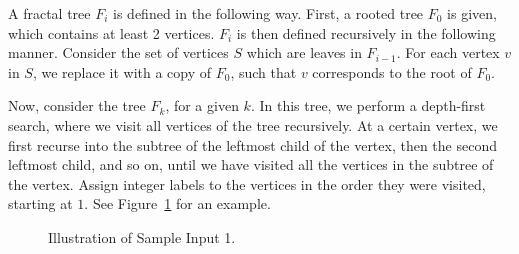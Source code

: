 
\noindent
A fractal tree $F_i$ is defined in the following way.
First, a rooted tree $F_0$ is given, which contains at least 2 vertices.
$F_i$ is then defined recursively in the following manner.
Consider the set of vertices $S$ which are leaves in $F_{i-1}$.
For each vertex $v$ in $S$, we replace it with a copy of $F_0$, such that $v$ corresponds to the root of $F_0$.

Now, consider the tree $F_k$, for a given $k$.  In this tree, we
perform a depth-first search, where we visit all vertices of the tree
recursively.  At a certain vertex, we first recurse into the subtree
of the leftmost child of the vertex, then the second leftmost child,
and so on, until we have visited all the vertices in the subtree of
the vertex.  Assign integer labels to the vertices in the order they
were visited, starting at $1$.  See Figure~\ref{fig:fractaltree} for
an example.

\begin{figure}[h!]
    \centering
    \quad\quad
    \quad\quad
    \caption{Illustration of Sample Input 1.}
    \label{fig:fractaltree}
\end{figure}


